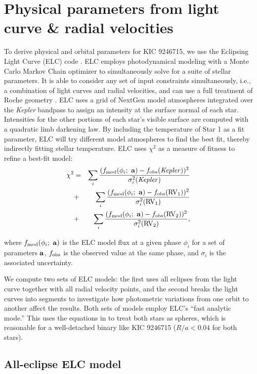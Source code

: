 \section{Physical parameters from light curve \& radial velocities}\label{model}
To derive physical and orbital parameters for KIC 9246715, we use the Eclipsing Light Curve (ELC) code \citep{oro00}. ELC employs photodynamical modeling with a Monte Carlo Markov Chain optimizer to simultaneously solve for a suite of stellar parameters. It is able to consider any set of input constraints simultaneously, i.e., a combination of light curves and radial velocities, and can use a full treatment of Roche geometry \citep{kop69,avn75}. ELC uses a grid of NextGen model atmospheres integrated over the \emph{Kepler} bandpass to assign an intensity at the surface normal of each star. Intensities for the other portions of each star's visible surface are computed with a quadratic limb darkening law. By including the temperature of Star 1 as a fit parameter, ELC will try different model atmospheres to find the best fit, thereby indirectly fitting stellar temperature.
ELC uses $\chi^2$ as a measure of fitness to refine a best-fit model:
\begin{eqnarray}
\chi^2 & = &
\sum_i \frac{ (f_{\rm{mod}}(\phi_i; \ {\bf a}) - f_{\rm{obs}}(\rm{\it{Kepler}}))^2 }{\sigma_i^2(\rm{\it{Kepler}})} \nonumber \\
& + & \sum_i \frac{ (f_{\rm{mod}}(\phi_i; \ {\bf a}) - f_{\rm{obs}}(\rm{RV_1}))^2 }{\sigma_i^2(\rm{RV_1})} \nonumber \\
& + & \sum_i \frac{(f_{\rm{mod}}(\phi_i; \ {\bf a}) - f_{\rm{obs}}(\rm{RV_2}))^2}{\sigma_i^2(\rm{RV_2})},
\end{eqnarray}

where $f_{\rm{mod}}(\phi_i; \ {\bf a})$ is the ELC model flux at a given phase $\phi_i$ for a set of parameters ${\bf a}$, $f_{\rm{obs}}$ is the observed value at the same phase, and $\sigma_i$ is the associated uncertainty.

We compute two sets of ELC models: the first uses all eclipses from the light curve together with all radial velocity points, and the second breaks the light curves into segments to investigate how photometric variations from one orbit to another affect the results. Both sets of models employ ELC's ``fast analytic mode.'' This uses the equations in \citet{man02} to treat both stars as spheres, which is reasonable for a well-detached binary like KIC 9246715 ($R/a < 0.04$ for both stars).

\subsection{All-eclipse ELC model}

